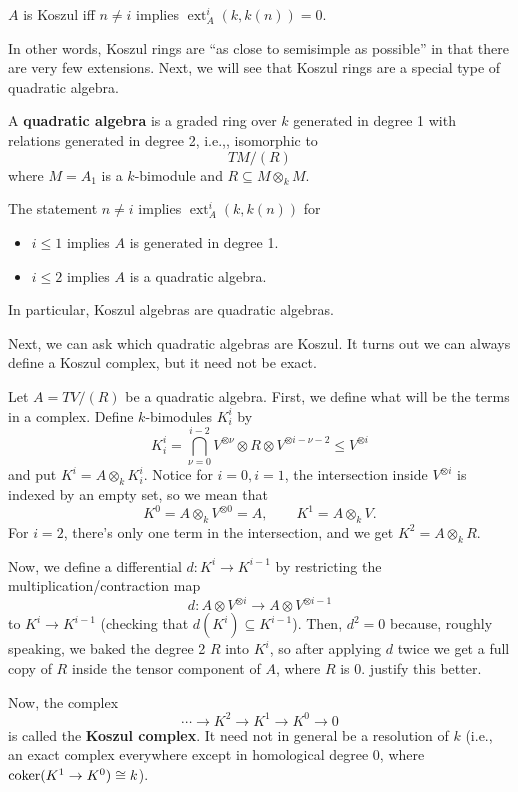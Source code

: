 \documentclass[12pt]{article}
\DeclareMathOperator{\ext}{ext}
\begin{document}
\begin{prop}
    $A$ is Koszul iff $n\neq i$ implies $\ext^i_A(k,k(n))=0$.
\end{prop}

In other words, Koszul rings are ``as close to semisimple as possible'' in that there are very few extensions. Next, we will see that Koszul rings are a special type of quadratic algebra.

\begin{defn}
    A \textbf{quadratic algebra} is a graded ring over $k$ generated in degree 1 with relations generated in degree 2, i.e.,, isomorphic to
    \[T M / (R)\]
    where $M=A_1$ is a $k$-bimodule and $R \subseteq M\otimes_k M$.
\end{defn}

\begin{prop}
    The statement $n\neq i$ implies $\ext^i_A(k,k(n))$ for
    \begin{itemize}
        \item $i\leq 1$ implies $A$ is generated in degree 1.
        \item $i\leq 2$ implies $A$ is a quadratic algebra.
    \end{itemize}
    In particular, Koszul algebras are quadratic algebras.
\end{prop}

Next, we can ask which quadratic algebras are Koszul. It turns out we can always define a Koszul complex, but it need not be exact.

\begin{construction}
    Let $A=TV/(R)$ be a quadratic algebra. First, we define what will be the terms in a complex. Define $k$-bimodules $K_i^i$ by
    \[K_i^i = \bigcap_{\nu = 0}^{i-2} V^{\otimes \nu} \otimes R \otimes V^{\otimes i-\nu -2} \leq V^{\otimes i}\]
    and put $K^i = A\otimes_k K_i^i$. Notice for $i=0,i=1$, the intersection inside $V^{\otimes i}$ is indexed by an empty set, so we mean that
    \[K^0 = A \otimes_k V^{\otimes 0} = A, \qquad K^1 = A\otimes_k V.\]
    For $i=2$, there's only one term in the intersection, and we get $K^2 = A \otimes_k R$.

    Now, we define a differential $d: K^i \to K^{i-1}$ by restricting the multiplication/contraction map
    \[d: A\otimes V^{\otimes i} \to A \otimes V^{\otimes i-1}\]
    to $K^i \to K^{i-1}$ (checking that $d(K^i) \subseteq K^{i-1}$). Then, $d^2=0$ because, roughly speaking, we baked the degree 2 $R$ into $K^i$, so after applying $d$ twice we get a full copy of $R$ inside the tensor component of $A$, where $R$ is 0. {\color{red} justify this better.}

    Now, the complex
    \[\cdots \to K^2 \to K^1 \to K^0 \to 0\]
    is called the \textbf{Koszul complex}. It need not in general be a resolution of $k$ (i.e., an exact complex everywhere except in homological degree 0, where $\mathrm{coker}(K^1 \to K^0) \cong k$).
\end{construction}
\end{document}
